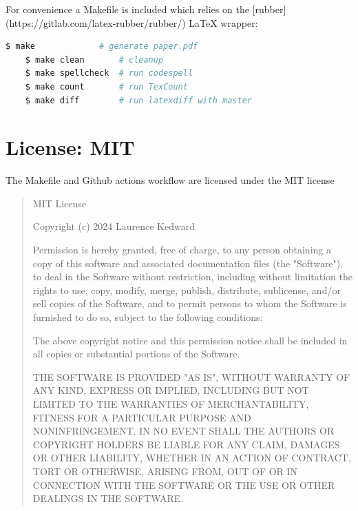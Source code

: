 \documentclass[]{article}
\begin{document}
For convenience a Makefile is included which relies on the [rubber](https://gitlab.com/latex-rubber/rubber/) LaTeX wrapper:


\begin{center}
	\begin{lstlisting}[language=Bash,morekeywords={make}]
	$ make             # generate paper.pdf
	$ make clean       # cleanup
	$ make spellcheck  # run codespell
	$ make count       # run TexCount
	$ make diff        # run latexdiff with master
	\end{lstlisting}
\end{center}


\section{License: MIT}

The Makefile and Github actions workflow are licensed under the MIT license

\begin{quote}
	MIT License

	Copyright (c) 2024 Laurence Kedward

	Permission is hereby granted, free of charge, to any person obtaining a copy
	of this software and associated documentation files (the "Software"), to deal
	in the Software without restriction, including without limitation the rights
	to use, copy, modify, merge, publish, distribute, sublicense, and/or sell
	copies of the Software, and to permit persons to whom the Software is
	furnished to do so, subject to the following conditions:

	The above copyright notice and this permission notice shall be included in all
	copies or substantial portions of the Software.

	THE SOFTWARE IS PROVIDED "AS IS", WITHOUT WARRANTY OF ANY KIND, EXPRESS OR
	IMPLIED, INCLUDING BUT NOT LIMITED TO THE WARRANTIES OF MERCHANTABILITY,
	FITNESS FOR A PARTICULAR PURPOSE AND NONINFRINGEMENT. IN NO EVENT SHALL THE
	AUTHORS OR COPYRIGHT HOLDERS BE LIABLE FOR ANY CLAIM, DAMAGES OR OTHER
	LIABILITY, WHETHER IN AN ACTION OF CONTRACT, TORT OR OTHERWISE, ARISING FROM,
	OUT OF OR IN CONNECTION WITH THE SOFTWARE OR THE USE OR OTHER DEALINGS IN THE
	SOFTWARE.
\end{quote}
\end{document}
